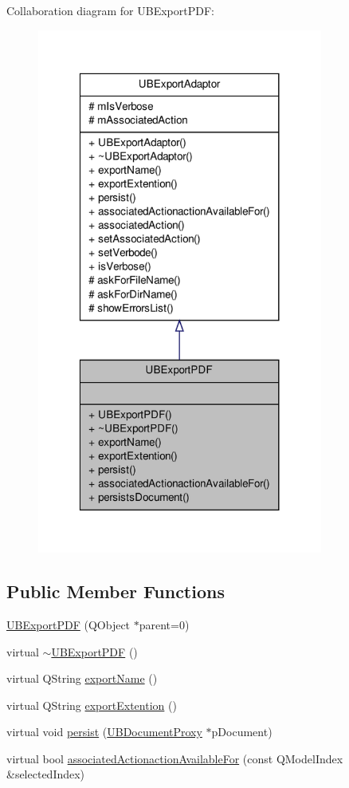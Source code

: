 Collaboration diagram for U\-B\-Export\-P\-D\-F\-:
\nopagebreak
\begin{figure}[H]
\begin{center}
\leavevmode
\includegraphics[width=266pt]{db/dd0/class_u_b_export_p_d_f__coll__graph}
\end{center}
\end{figure}
\subsection*{Public Member Functions}
\begin{DoxyCompactItemize}
\item 
\hyperlink{class_u_b_export_p_d_f_a319cf0cc4711ffa520bf65a3b68c712f}{U\-B\-Export\-P\-D\-F} (Q\-Object $\ast$parent=0)
\item 
virtual \hyperlink{class_u_b_export_p_d_f_a9673f8eb0825bf9e774d1011dbc938f6}{$\sim$\-U\-B\-Export\-P\-D\-F} ()
\item 
virtual Q\-String \hyperlink{class_u_b_export_p_d_f_aa54c7be687928926781c632b800e070b}{export\-Name} ()
\item 
virtual Q\-String \hyperlink{class_u_b_export_p_d_f_a6880ba7958a7978be5dbc8e88dd65e74}{export\-Extention} ()
\item 
virtual void \hyperlink{class_u_b_export_p_d_f_a3bf65a44796339804e3beab23adfdc6f}{persist} (\hyperlink{class_u_b_document_proxy}{U\-B\-Document\-Proxy} $\ast$p\-Document)
\item 
virtual bool \hyperlink{class_u_b_export_p_d_f_a6454f64338c25957060d8da94e845918}{associated\-Actionaction\-Available\-For} (const Q\-Model\-Index \&selected\-Index)
\end{DoxyCompactItemize}
